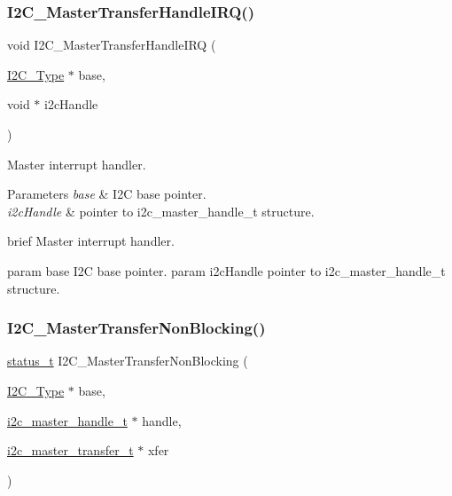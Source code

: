 \subsubsection{\texorpdfstring{I2C\_MasterTransferHandleIRQ()}{I2C\_MasterTransferHandleIRQ()}}
{\footnotesize\ttfamily void I2\+C\+\_\+\+Master\+Transfer\+Handle\+I\+RQ (\begin{DoxyParamCaption}\item[{\mbox{\hyperlink{struct_i2_c___type}{I2\+C\+\_\+\+Type}} $\ast$}]{base,  }\item[{void $\ast$}]{i2c\+Handle }\end{DoxyParamCaption})}



Master interrupt handler. 


\begin{DoxyParams}{Parameters}
{\em base} & I2C base pointer. \\
\hline
{\em i2c\+Handle} & pointer to i2c\+\_\+master\+\_\+handle\+\_\+t structure.\\
\hline
\end{DoxyParams}
brief Master interrupt handler.

param base I2C base pointer. param i2c\+Handle pointer to i2c\+\_\+master\+\_\+handle\+\_\+t structure. \mbox{\label{group__i2c__driver_gac7f76a04b6f6873c52ad176d58901fe9}} 
\subsubsection{\texorpdfstring{I2C\_MasterTransferNonBlocking()}{I2C\_MasterTransferNonBlocking()}}
{\footnotesize\ttfamily \mbox{\hyperlink{group__ksdk__common_gaaabdaf7ee58ca7269bd4bf24efcde092}{status\+\_\+t}} I2\+C\+\_\+\+Master\+Transfer\+Non\+Blocking (\begin{DoxyParamCaption}\item[{\mbox{\hyperlink{struct_i2_c___type}{I2\+C\+\_\+\+Type}} $\ast$}]{base,  }\item[{\mbox{\hyperlink{group__i2c__driver_ga2fd51f58b8cfd309be985bce4b817fdc}{i2c\+\_\+master\+\_\+handle\+\_\+t}} $\ast$}]{handle,  }\item[{\mbox{\hyperlink{group__i2c__driver_ga0e25c3c153992361c8d359a86b70d3c6}{i2c\+\_\+master\+\_\+transfer\+\_\+t}} $\ast$}]{xfer }\end{DoxyParamCaption})}



